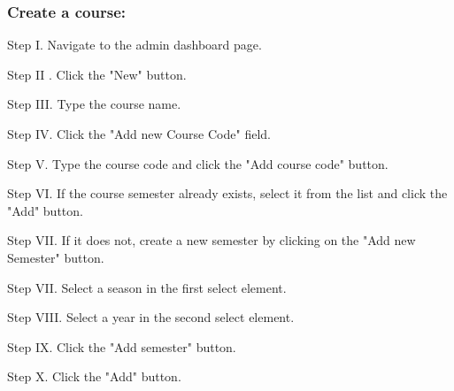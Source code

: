 \subsubsection{Create a course:}

\begin{userManualItemlist}
    \item[Step I.] Navigate to the admin dashboard page.
    \item[Step II]. Click the "New" button.
    \item[Step III.] Type the course name.
    \item[Step IV.] Click the "Add new Course Code" field.
    \item[Step V.] Type the course code and click the "Add course code" button.
    \item[Step VI.] If the course semester already exists, select it from the list and click the "Add" button.
    \item[Step VII.] If it does not, create a new semester by clicking on the "Add new Semester" button.
    \item[Step VII.] Select a season in the first select element.
    \item[Step VIII.] Select a year in the second select element.
    \item[Step IX.] Click the "Add semester" button.
    \item[Step X.] Click the "Add" button.    
\end{userManualItemlist}